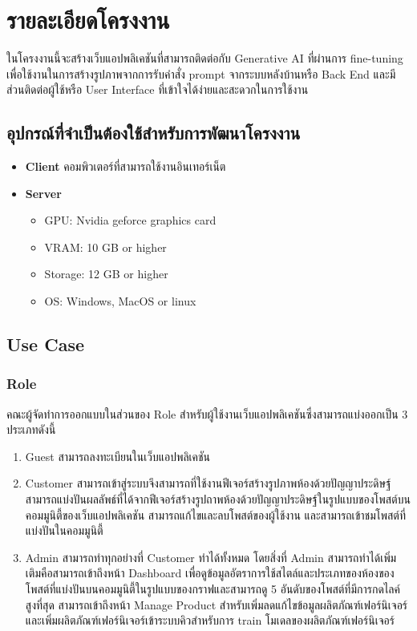 \documentclass[12pt,oneside,openright,a4paper]{cpe-thai-project}
\begin{document}
\clearpage
\section{รายละเอียดโครงงาน}
\hspace {18pt} ในโครงงานนี้จะสร้างเว็บแอปพลิเคชันที่สามารถติดต่อกับ Generative AI ที่ผ่านการ fine-tuning เพื่อใช้งานในการสร้างรูปภาพจากการรับคำสั่ง prompt จากระบบหลังบ้านหรือ Back End และมีส่วนติดต่อผู้ใช้หรือ User Interface ที่เข้าใจได้ง่ายและสะดวกในการใช้งาน

\subsection{อุปกรณ์ที่จำเป็นต้องใช้สำหรับการพัฒนาโครงงาน}

\begin{itemize}
  \item \textbf{Client} คอมพิวเตอร์ที่สามารถใช้งานอินเทอร์เน็ต
  \item \textbf{Server}
        \begin{itemize}
          \item GPU: Nvidia geforce graphics card
          \item VRAM: 10 GB or higher
          \item Storage: 12 GB or higher
          \item OS: Windows, MacOS or linux \cite{pcsystem}
        \end{itemize}
\end{itemize}

\subsection{Use Case}
\subsubsection{Role}
\hspace{18pt}คณะผู้จัดทำการออกแบบในส่วนของ Role สำหรับผู้ใช้งานเว็บแอปพลิเคชันซึ่งสามารถแบ่งออกเป็น 3 ประเภทดังนี้
\begin{enumerate}
  \item Guest    สามารถลงทะเบียนในเว็บแอปพลิเคชัน
  \item Customer สามารถเข้าสู่ระบบจึงสามารถที่ใช้งานฟีเจอร์สร้างรูปภาพห้องด้วยปัญญาประดิษฐ์ สามารถแบ่งปันผลลัพธ์ที่ได้จากฟีเจอร์สร้างรูปถาพห้องด้วยปัญญาประดิษฐ์ในรูปแบบของโพสต์บนคอมมูนิตี้ของเว็บแอปพลิเคชัน สามารถแก้ไขและลบโพสต์ของผู้ใช้งาน และสามารถเข้าชมโพสต์ที่แบ่งปันในคอมมูนิตี้
  \item Admin    สามารถทำทุกอย่างที่ Customer ทำได้ทั้งหมด โดยสิ่งที่ Admin สามารถทำได้เพิ่มเติมคือสามารถเข้าถึงหน้า Dashboard เพื่อดูข้อมูลอัตราการใช้สไตล์และประเภทของห้องของโพสต์ที่แบ่งปันบนคอมมูนิตี้ในรูปแบบของกราฟและสามารถดู 5 อันดับของโพสต์ที่มีการกดไลค์สูงที่สุด สามารถเข้าถึงหน้า Manage Product สำหรับเพิ่มลดแก้ไขข้อมูลผลิตภัณฑ์เฟอร์นิเจอร์ และเพิ่มผลิตภัณฑ์เฟอร์นิเจอร์เข้าระบบคิวสำหรับการ train โมเดลของผลิตภัณฑ์เฟอร์นิเจอร์
\end{enumerate}
\clearpage
\end{document}
